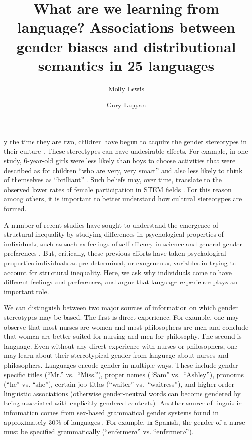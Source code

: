 \documentclass[9pt,twocolumn,twoside]{pnas-new}
\title{What are we learning from language? Associations between gender biases
and distributional semantics in 25 languages}
\author[a,b,1]{Molly Lewis}
\author[b,1,2]{Gary Lupyan}
\affil[a]{University of Chicago}
\affil[b]{University of Wisconsin-Madison}
\begin{document}
\maketitle
\thispagestyle{firststyle}

y the time they are two, children  have begun to acquire the
gender stereotypes in their culture \cite{gelman2004mother}. These
stereotypes can have undesirable effects. For example, in one study,
6-year-old girls were less likely than boys to choose activities that
were described as for children \enquote{who are very, very smart} and
also less likely to think of themselves as \enquote{brilliant}  \cite{bian2017gender} . Such beliefs may, over time, translate to the
observed lower rates of female participation in STEM fields \cite{ceci2011understanding,leslie2015expectations,miller2015women,stoet2018gender}. For this reason among others,
it is important to better understand how cultural stereotypes are
formed.

A number of recent studies have sought to understand the emergence of structural inequality by studying differences in psychological properties of individuals, such as  such as feelings of self-efficacy in science \cite{stoet2018gender} and general gender preferences \cite{falk2018relationship}.  But, critically, these previous efforts have taken psychological properties individuals as pre-determined, or exogeneous, variables in trying to account for structural inequality. Here, we ask why individuals come to have different feelings and preferences, and argue that language experience plays an important role.

We can distinguish between two major sources of information on which
gender stereotypes may be based. The first is direct experience. For
example, one may observe that most nurses are women and most
philosophers are men and conclude that women are better suited for
nursing and men for philosophy. The second is language. Even without any
direct experience with nurses or philosophers, one may learn about their
stereotypical gender from language about nurses and philosophers.
Languages encode gender in multiple ways. These include gender-specific
titles (\enquote{Mr.} vs.\ \enquote{Miss.}), proper names (\enquote{Sam}
vs.\ \enquote{Ashley}), pronouns (\enquote{he} vs. \enquote{she}),
certain job titles (\enquote{waiter} vs.\ \enquote{waitress}), and
higher-order linguistic associations (otherwise gender-neutral words can
become gendered by being associated with explicitly gendered contexts).
Another source of linguistic information comes from sex-based
grammatical gender systems found in approximately 30\% of languages \cite{wals}. For example, in Spanish, the gender of a
nurse must be specified grammatically (\enquote{enfermer\emph{a}} vs.
\enquote{enfermer\emph{o}}).
\end{document}
